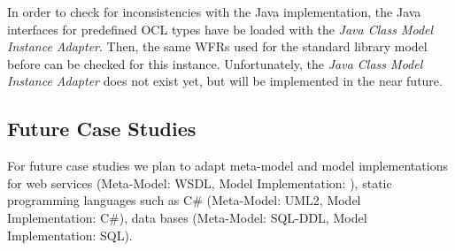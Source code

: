 In order to check for inconsistencies with the Java implementation, the Java interfaces 
for predefined OCL types have  be loaded with the \textit{Java Class Model Instance Adapter}. Then, the same WFRs 
used for the standard library model before can be checked for this instance. 
Unfortunately, the \textit{Java Class Model Instance Adapter} does not exist yet, but will be 
implemented in the near future.


\subsection{Future Case Studies}

For future case studies we plan to adapt meta-model and model implementations for web services (Meta-Model: WSDL, Model Implementation: ), static programming languages such as C\# (Meta-Model: UML2, Model Implementation: C\#), data bases (Meta-Model: SQL-DDL, Model Implementation: SQL). 

